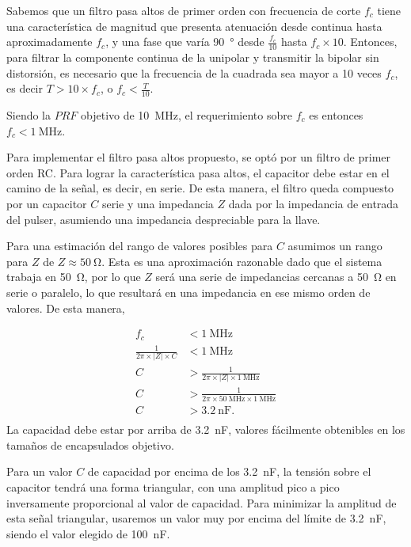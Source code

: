 Sabemos que un filtro pasa altos de primer orden con frecuencia de corte $f_c$
tiene una característica de magnitud que presenta atenuación desde continua hasta
aproximadamente $f_c$, y una fase que varía \qty{90}{\degree} desde
$\frac{f_c}{10}$ hasta $f_c \times 10$. Entonces, para filtrar la componente
continua de la unipolar y transmitir la bipolar sin distorsión,
es necesario que la frecuencia de la cuadrada sea mayor a 10 veces $f_c$, es
decir $T > 10 \times f_c$, o $f_c < \frac{T}{10}$.

Siendo la $PRF$ objetivo de \qty{10}{\mega\hertz}, el requerimiento sobre $f_c$
es entonces $f_c < \qty{1}{\mega\hertz}$.

Para implementar el filtro pasa altos propuesto, se optó por un filtro de primer
orden RC. Para lograr la característica pasa altos, el capacitor debe estar en
el camino de la señal, es decir, en serie. De esta manera, el filtro queda
compuesto por un capacitor $C$ serie y una impedancia $Z$ dada por la impedancia
de entrada del pulser, asumiendo una impedancia despreciable para la llave.

Para una estimación del rango de valores posibles para $C$ asumimos un rango
para $Z$ de $ Z \approx \qty{50}{\ohm}$. Esta es una aproximación razonable dado
que el sistema trabaja en \qty{50}{\ohm}, por lo que $Z$ será una serie de
impedancias cercanas a \qty{50}{\ohm} en serie o paralelo, lo que resultará en
una impedancia en ese mismo orden de valores. De esta manera,

\begin{equation}
    \begin{aligned}
        f_c &< \qty{1}{\mega\hertz} \\
        \frac{1}{2\pi \times |Z| \times C} &< \qty{1}{\mega\hertz} \\
        C &> \frac{1}{2\pi \times |Z| \times \qty{1}{\mega\hertz}} \\
        C &> \frac{1}{2\pi \times \qty{50}{\mega\hertz} \times \qty{1}{\mega\hertz}} \\
        C &> \qty{3.2}{\nano\farad}. \\
    \end{aligned}
\end{equation}
La capacidad debe estar por arriba de \qty{3.2}{\nano\farad}, valores fácilmente
obtenibles en los tamaños de encapsulados objetivo.

Para un valor $C$ de capacidad por encima de los \qty{3.2}{\nano\farad}, la
tensión sobre el capacitor tendrá una forma triangular, con una amplitud pico a
pico inversamente proporcional al valor de capacidad. Para minimizar la amplitud
de esta señal triangular, usaremos un valor muy por encima del límite de
\qty{3.2}{\nano\farad}, siendo el valor elegido de \qty{100}{\nano\farad}.

